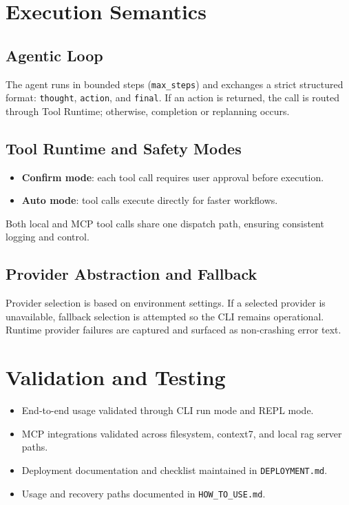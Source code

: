 \documentclass[11pt, letterpaper]{article}
\begin{document}
\section{Execution Semantics}

\subsection{Agentic Loop}
The agent runs in bounded steps (\texttt{max\_steps}) and exchanges a strict structured format:
\texttt{thought}, \texttt{action}, and \texttt{final}. If an action is returned, the call is routed through
Tool Runtime; otherwise, completion or replanning occurs.

\subsection{Tool Runtime and Safety Modes}
\begin{itemize}
    \item \textbf{Confirm mode}: each tool call requires user approval before execution.
    \item \textbf{Auto mode}: tool calls execute directly for faster workflows.
\end{itemize}

Both local and MCP tool calls share one dispatch path, ensuring consistent logging and control.

\subsection{Provider Abstraction and Fallback}
Provider selection is based on environment settings. If a selected provider is unavailable,
fallback selection is attempted so the CLI remains operational. Runtime provider failures are
captured and surfaced as non-crashing error text.

\section{Validation and Testing}

\begin{itemize}
    \item End-to-end usage validated through CLI run mode and REPL mode.
    \item MCP integrations validated across filesystem, context7, and local rag server paths.
    \item Deployment documentation and checklist maintained in \texttt{DEPLOYMENT.md}.
    \item Usage and recovery paths documented in \texttt{HOW\_TO\_USE.md}.
\end{itemize}
\end{document}
